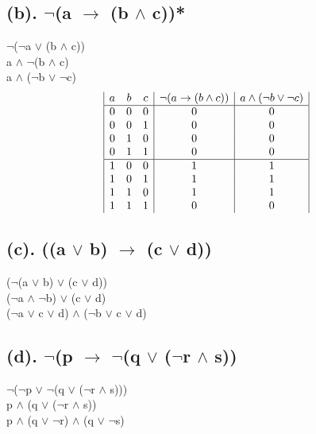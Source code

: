 \documentclass[a4paper]{article}
\begin{document}
\subsection{(b). $\neg $(a $\rightarrow $ (b $\wedge $ c))*}
$\neg $($\neg $a $\vee $ (b $\wedge $ c))\\
a $\wedge $ $\neg $(b $\wedge $ c)\\
a $\wedge $ ($\neg $b $\vee $ $\neg $c)
\begin{displaymath}
    \begin{array}{|c c c|c|c|}
        a & b & c & \neg (a \rightarrow (b \wedge c)) & a \wedge (\neg b \vee \neg c) \\
        \hline
        0 & 0 & 0 & 0                            & 0                           \\
        0 & 0 & 1 & 0                            & 0                           \\
        0 & 1 & 0 & 0                            & 0                           \\
        0 & 1 & 1 & 0                            & 0                           \\
        \hline
        1 & 0 & 0 & 1                            & 1                           \\
        1 & 0 & 1 & 1                            & 1                           \\
        1 & 1 & 0 & 1                            & 1                           \\
        1 & 1 & 1 & 0                            & 0                           \\
    \end{array}
\end{displaymath}
\subsection{(c). ((a $\vee $ b) $\rightarrow $ (c $\vee $ d))}
($\neg $(a $\vee $ b) $\vee $ (c $\vee $ d))\\
($\neg $a $\wedge $ $\neg $b) $\vee $ (c $\vee $ d)\\
($\neg $a $\vee $ c $\vee $ d) $\wedge $ ($\neg $b $\vee $ c $\vee $ d)
\subsection{(d). $\neg $(p $\rightarrow $ $\neg $(q $\vee $ ($\neg $r $\wedge $ s))}
$\neg $($\neg $p $\vee $ $\neg $(q $\vee $ ($\neg $r $\wedge $ s)))\\
p $\wedge $ (q $\vee $ ($\neg $r $\wedge $ s))\\
p $\wedge $ (q $\vee $ $\neg $r) $\wedge $ (q $\vee $ $\neg $s)
\end{document}
